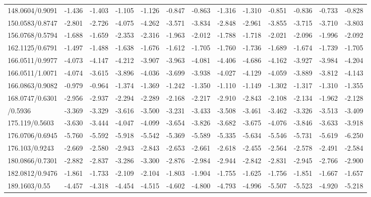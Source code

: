 \documentclass[]{elsarticle} %
\begin{document}
\begin{table}[H]
{\begin{tabular}[t]{lrrrrrrrrrrrr}
148.0604/0.9091 & -1.436 & -1.403 & -1.105 & -1.126 & -0.847 & -0.863 & -1.316 & -1.310 & -0.851 & -0.836 & -0.733 & -0.828\\
\rowcolor{gray!6}  150.0583/0.8747 & -2.801 & -2.726 & -4.075 & -4.262 & -3.571 & -3.834 & -2.848 & -2.961 & -3.855 & -3.715 & -3.710 & -3.803\\
156.0768/0.5794 & -1.688 & -1.659 & -2.353 & -2.316 & -1.963 & -2.012 & -1.788 & -1.718 & -2.021 & -2.096 & -1.996 & -2.092\\
\addlinespace
\rowcolor{gray!6}  162.1125/0.6791 & -1.497 & -1.488 & -1.638 & -1.676 & -1.612 & -1.705 & -1.760 & -1.736 & -1.689 & -1.674 & -1.739 & -1.705\\
166.0511/0.9977 & -4.073 & -4.147 & -4.212 & -3.907 & -3.963 & -4.081 & -4.406 & -4.686 & -4.162 & -3.927 & -3.984 & -4.204\\
\rowcolor{gray!6}  166.0511/1.0071 & -4.074 & -3.615 & -3.896 & -4.036 & -3.699 & -3.938 & -4.027 & -4.129 & -4.059 & -3.889 & -3.812 & -4.143\\
166.0863/0.9082 & -0.979 & -0.964 & -1.374 & -1.369 & -1.242 & -1.350 & -1.110 & -1.149 & -1.302 & -1.317 & -1.310 & -1.355\\
\rowcolor{gray!6}  168.0747/0.6301 & -2.956 & -2.937 & -2.294 & -2.289 & -2.168 & -2.217 & -2.910 & -2.843 & -2.108 & -2.134 & -1.962 & -2.128\\
\addlinespace
170.0924/0.5936 & -3.369 & -3.329 & -3.616 & -3.500 & -3.231 & -3.433 & -3.508 & -3.461 & -3.462 & -3.326 & -3.513 & -3.409\\
\rowcolor{gray!6}  175.119/0.5603 & -3.630 & -3.444 & -4.047 & -4.099 & -3.654 & -3.826 & -3.682 & -3.675 & -4.076 & -3.846 & -3.633 & -3.918\\
176.0706/0.6945 & -5.760 & -5.592 & -5.918 & -5.542 & -5.369 & -5.589 & -5.335 & -5.634 & -5.546 & -5.731 & -5.619 & -6.250\\
\rowcolor{gray!6}  176.103/0.9243 & -2.669 & -2.580 & -2.943 & -2.843 & -2.653 & -2.661 & -2.618 & -2.455 & -2.564 & -2.578 & -2.491 & -2.584\\
180.0866/0.7301 & -2.882 & -2.837 & -3.286 & -3.300 & -2.876 & -2.984 & -2.944 & -2.842 & -2.831 & -2.945 & -2.766 & -2.900\\
\addlinespace
\rowcolor{gray!6}  182.0812/0.9476 & -1.861 & -1.733 & -2.109 & -2.104 & -1.803 & -1.904 & -1.755 & -1.625 & -1.756 & -1.851 & -1.667 & -1.657\\
189.1603/0.55 & -4.457 & -4.318 & -4.454 & -4.515 & -4.602 & -4.800 & -4.793 & -4.996 & -5.507 & -5.523 & -4.920 & -5.218\\

\end{tabular}}
\end{table}
\end{document}
